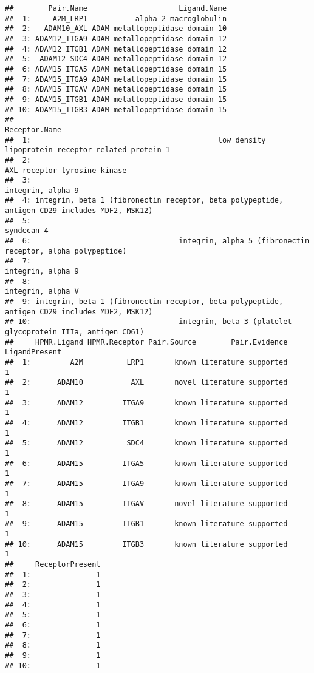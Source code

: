 \documentclass[
]{article}
\begin{document}
\begin{verbatim}
##        Pair.Name                     Ligand.Name
##  1:     A2M_LRP1           alpha-2-macroglobulin
##  2:   ADAM10_AXL ADAM metallopeptidase domain 10
##  3: ADAM12_ITGA9 ADAM metallopeptidase domain 12
##  4: ADAM12_ITGB1 ADAM metallopeptidase domain 12
##  5:  ADAM12_SDC4 ADAM metallopeptidase domain 12
##  6: ADAM15_ITGA5 ADAM metallopeptidase domain 15
##  7: ADAM15_ITGA9 ADAM metallopeptidase domain 15
##  8: ADAM15_ITGAV ADAM metallopeptidase domain 15
##  9: ADAM15_ITGB1 ADAM metallopeptidase domain 15
## 10: ADAM15_ITGB3 ADAM metallopeptidase domain 15
##                                                                                    Receptor.Name
##  1:                                           low density lipoprotein receptor-related protein 1
##  2:                                                                 AXL receptor tyrosine kinase
##  3:                                                                            integrin, alpha 9
##  4: integrin, beta 1 (fibronectin receptor, beta polypeptide, antigen CD29 includes MDF2, MSK12)
##  5:                                                                                   syndecan 4
##  6:                                  integrin, alpha 5 (fibronectin receptor, alpha polypeptide)
##  7:                                                                            integrin, alpha 9
##  8:                                                                            integrin, alpha V
##  9: integrin, beta 1 (fibronectin receptor, beta polypeptide, antigen CD29 includes MDF2, MSK12)
## 10:                                  integrin, beta 3 (platelet glycoprotein IIIa, antigen CD61)
##     HPMR.Ligand HPMR.Receptor Pair.Source        Pair.Evidence LigandPresent
##  1:         A2M          LRP1       known literature supported             1
##  2:      ADAM10           AXL       novel literature supported             1
##  3:      ADAM12         ITGA9       known literature supported             1
##  4:      ADAM12         ITGB1       known literature supported             1
##  5:      ADAM12          SDC4       known literature supported             1
##  6:      ADAM15         ITGA5       known literature supported             1
##  7:      ADAM15         ITGA9       known literature supported             1
##  8:      ADAM15         ITGAV       novel literature supported             1
##  9:      ADAM15         ITGB1       known literature supported             1
## 10:      ADAM15         ITGB3       known literature supported             1
##     ReceptorPresent
##  1:               1
##  2:               1
##  3:               1
##  4:               1
##  5:               1
##  6:               1
##  7:               1
##  8:               1
##  9:               1
## 10:               1
\end{verbatim}
\end{document}
